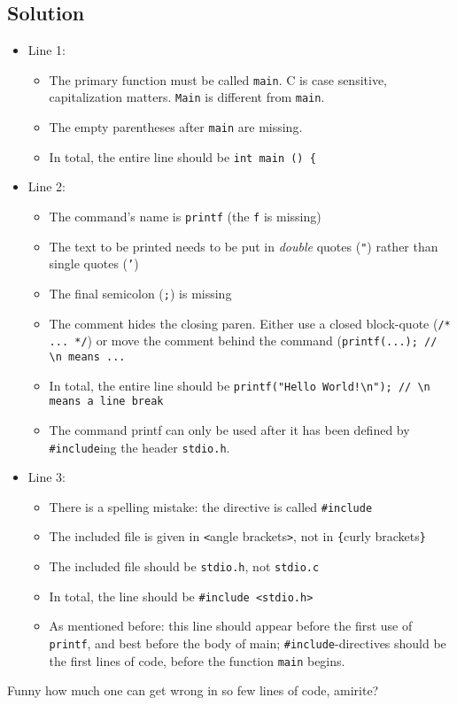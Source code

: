\newpage

\subsection*{Solution}
\begin{itemize}
\item Line 1:
	\begin{itemize}
	\item The primary function must be called \texttt{main}. C is case sensitive, \ie capitalization matters. \texttt{Main} is different from \texttt{main}.
	\item The empty parentheses after \texttt{main} are missing.
	\item In total, the entire line should be \texttt{int main () \{}
	\end{itemize}
\item Line 2:
	\begin{itemize}
	\item The command's name is \texttt{printf} (the \texttt{f} is missing)
	\item The text to be printed needs to be put in \emph{double} quotes (\texttt{"}) rather than single quotes (\texttt{'})
	\item The final semicolon (\texttt{;}) is missing
	\item The comment hides the closing paren. Either use a closed block-quote (\texttt{/* ... */}) or move the comment behind the command (\texttt{printf(...); // \textbackslash n means ...}
	\item In total, the entire line should be \texttt{printf("Hello World!\textbackslash n"); // \textbackslash n means  a line break}
	\item The command printf can only be used after it has been defined by \texttt{\#include}ing the header \texttt{stdio.h}.
	\end{itemize}
\item Line 3:
	\begin{itemize}
	\item There is a spelling mistake: the directive is called \texttt{\#include}
	\item The included file is given in \texttt{<}angle brackets\texttt{>}, not in \texttt{\{}curly brackets\texttt{\}}
	\item The included file should be \texttt{stdio.h}, not \texttt{stdio.c}
	\item In total, the line should be \texttt{\#include <stdio.h>}
	\item As mentioned before: this line should appear before the first use of \texttt{printf}, and best before the body of main; \texttt{\#include}-directives should be the 
		first lines of code, before the function \texttt{main} begins.
	\end{itemize}
\end{itemize}

Funny how much one can get wrong in so few lines of code, amirite?